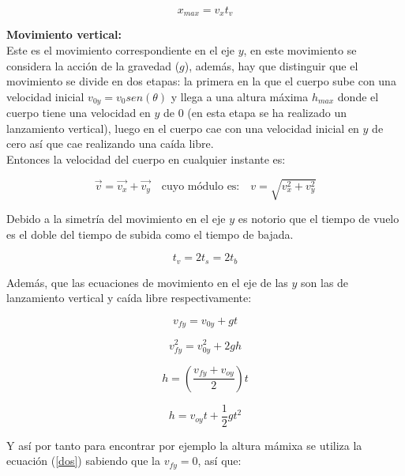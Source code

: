 \documentclass[a5paper,pagesize,10pt,bibtotoc,pointlessnumbers,
normalheadings,DIV=9,fleqn,x11names,table,twoside=false]{scrbook}
\begin{document}
\begin{equation}
 x_{max} =  v_x t_v
\end{equation}

\textbf{Movimiento vertical:}\\

Este es el movimiento correspondiente en el eje $y$, en este movimiento se considera la acción de la gravedad ($g$), además, hay 
que distinguir que el movimiento se divide en dos etapas: la primera en la que el cuerpo sube con una velocidad inicial $v_{0y} = 
 v_0 sen(\theta)$ y llega a una altura máxima $h_{max}$ donde el cuerpo tiene una velocidad en $y$ de 0 (en esta etapa se ha 
realizado un lanzamiento vertical), luego en el cuerpo cae con una velocidad inicial en $y$ de cero así que cae realizando una 
caída libre.\\

Entonces la velocidad del cuerpo en cualquier instante es:

\begin{equation}
 \vec{v} = \vec{v_x} + \vec{v_y}\quad \text{cuyo módulo es:} \quad v = \sqrt{v_x^2+v_y^2}
\end{equation}

Debido a la simetría del movimiento en el eje $y$ es notorio que el tiempo de vuelo es el doble del tiempo de subida como el 
tiempo de bajada.

\begin{equation}
 t_v = 2t_s =2t_b
\end{equation}

Además, que las ecuaciones de movimiento en el eje de las $y$ son las de lanzamiento vertical y caída libre respectivamente:

\begin{equation}
 v_{fy} = v_{0y} + gt
\end{equation}

\begin{equation}
 v_{fy}^2 = v_{0y}^2 + 2gh
\end{equation}\label{dos}

\begin{equation}
 h =(\frac{v_{fy}+v_{oy}}{2})t
\end{equation}

\begin{equation}
 h = v_{oy}t + \frac{1}{2}gt^2
\end{equation}

Y así por tanto para encontrar por ejemplo la altura mámixa se utiliza la ecuación (\ref{dos}) sabiendo que la $v_{fy} = 0$, así 
que:
\end{document}

